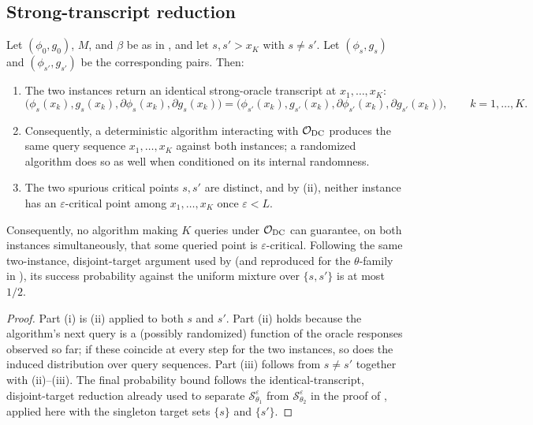 \subsection{Strong-transcript reduction}
\label{subsec:reduction}

\begin{lemma}
\label{lem:strong-reduction}
Let $(\phi_0,g_0)$, $M$, and $\beta$ be as in , and
let $s,s'>x_K$ with $s\neq s'$. Let $(\phi_s,g_s)$ and $(\phi_{s'},g_{s'})$
be the corresponding pairs. Then:
\begin{enumerate}
\item[\textup{(i)}] The two instances return an identical strong-oracle
transcript at $x_1,\ldots,x_K$:
\[
    \bigl(\phi_s(x_k),g_s(x_k),\partial\phi_s(x_k),\partial g_s(x_k)\bigr)
    =
    \bigl(\phi_{s'}(x_k),g_{s'}(x_k),\partial\phi_{s'}(x_k),\partial g_{s'}(x_k)\bigr),
    \qquad
    k=1,\ldots,K.
\]
\item[\textup{(ii)}] Consequently, a deterministic algorithm interacting
with $\mathcal O_{\rm DC}$ produces the same query sequence
$x_1,\ldots,x_K$ against both instances; a randomized algorithm does so
as well when conditioned on its internal randomness.
\item[\textup{(iii)}] The two spurious critical points $s,s'$ are
distinct, and by (ii), neither instance has an
$\varepsilon$-critical point among $x_1,\ldots,x_K$ once $\varepsilon<L$.
\end{enumerate}
Consequently, no algorithm making $K$ queries under $\mathcal O_{\rm DC}$
can guarantee, on both instances simultaneously, that some queried point
is $\varepsilon$-critical. Following the same two-instance,
disjoint-target argument used by \citet[Theorem~5]{Zhang-2020-Complexity}
(and reproduced for the $\theta$-family in ),
its success probability against the uniform mixture over $\{s,s'\}$ is at
most $1/2$.
\end{lemma}

\begin{proof}
Part (i) is (ii) applied to both $s$ and $s'$. Part
(ii) holds because the algorithm's next query is a (possibly randomized)
function of the oracle responses observed so far; if these coincide at
every step for the two instances, so does the induced distribution over
query sequences. Part (iii) follows from $s\neq s'$ together with
(ii)--(iii). The final probability bound follows
the identical-transcript, disjoint-target reduction already used to
separate $\mathcal S_{\theta_1}^\varepsilon$ from
$\mathcal S_{\theta_2}^\varepsilon$ in the proof of
, applied here with the singleton target sets
$\{s\}$ and $\{s'\}$.
\end{proof}

